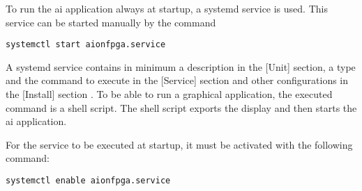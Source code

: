 To run the \acrshort{ai} application always at startup, a systemd service is used.
This service can be started manually by the command
\begin{lstlisting}[style=bash, caption={}, label=lst:start_service]
  systemctl start aionfpga.service
\end{lstlisting}
A systemd service contains in minimum a description in the [Unit] section, a type and the command to execute in the [Service] section and other configurations in the [Install] section \cite{systemd}. 
To be able to run a graphical application, the executed command is a shell script.
The shell script exports the display and then starts the \acrshort{ai} application.

For the service to be executed at startup, it must be activated with the following command:
\begin{lstlisting}[style=bash, caption={}, label=lst:enable_service]
  systemctl enable aionfpga.service
\end{lstlisting}
